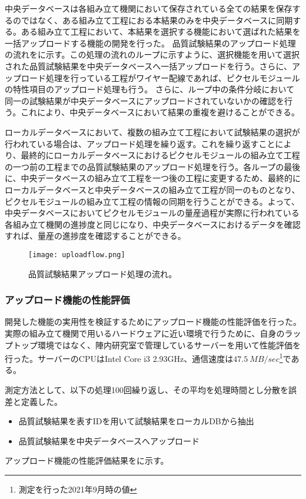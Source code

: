 中央データベースは各組み立て機関において保存されている全ての結果を保存するのではなく、ある組み立て工程におる本結果のみを中央データベースに同期する。ある組み立て工程において、本結果を選択する機能において選ばれた結果を一括アップロードする機能の開発を行った。
品質試験結果のアップロード処理の流れをに示す。この処理の流れのループに示すように、選択機能を用いて選択された品質試験結果を中央データベースへ一括アップロードを行う。さらに、アップロード処理を行っている工程がワイヤー配線であれば、ピクセルモジュールの特性項目のアップロード処理も行う。
さらに、ループ中の条件分岐において同一の試験結果が中央データベースにアップロードされていないかの確認を行う。これにより、中央データベースにおいて結果の重複を避けることができる。

ローカルデータベースにおいて、複数の組み立て工程において試験結果の選択が行われている場合は、アップロード処理を繰り返す。これを繰り返すことにより、最終的にローカルデータベースにおけるピクセルモジュールの組み立て工程の一つ前の工程までの品質試験結果のアップロード処理を行う。各ループの最後に、中央データベースの組み立て工程を一つ後の工程に変更するため、最終的にローカルデータベースと中央データベースの組み立て工程が同一のものとなり、ピクセルモジュールの組み立て工程の情報の同期を行うことができる。よって、中央データベースにおいてピクセルモジュールの量産過程が実際に行われている各組み立て機関の進捗度と同じになり、中央データベースにおけるデータを確認すれば、量産の進捗度を確認することができる。

\begin{figure}[tbp]
  \centering
  \texttt{[image: uploadflow.png]}
  \caption[品質試験結果アップロード処理の流れ]{品質試験結果アップロード処理の流れ。}
  \label{fig:uploadresults}
\end{figure}


\subsubsection{アップロード機能の性能評価}

開発した機能の実用性を検証するためにアップロード機能の性能評価を行った。実際の組み立て機関で用いるハードウェアに近い環境で行うために、自身のラップトップ環境ではなく、陣内研究室で管理しているサーバーを用いて性能評価を行った。サーバーのCPUはIntel Core i3 2.93GHz、通信速度は$47.5\ \si{MB/sec}$\footnote{測定を行った2021年9月時の値}である。

測定方法として、以下の処理100回繰り返し、その平均を処理時間とし分散を誤差と定義した。
\begin{itemize}
  \item[1. ] 品質試験結果を表すIDを用いて試験結果をローカルDBから抽出
  \item[2. ] 品質試験結果を中央データベースへアップロード
\end{itemize}
アップロード機能の性能評価結果をに示す。

